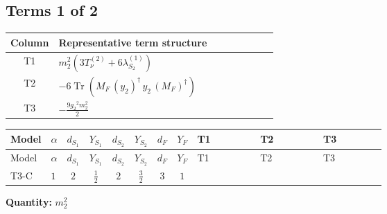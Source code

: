 \documentclass[8pt]{article}
\begin{document}
\begin{landscape}
\subsection*{Terms 1 of 2}
\begin{center}
\begin{tabular}{@{}c >{\raggedright\arraybackslash}p{0.82\linewidth}@{}}
\toprule
Column & Representative term structure \\
\midrule
T1 & \(\displaystyle {m_2^2} (3 T_{\nu}^{(2)}+6 {\lambda_{S_2}^{(1)}})\) \\
\midrule
T2 & \(\displaystyle -6 \operatorname{Tr}\!\left({M_F}\,\left({y_2}\right)^{\dagger}\,{y_2}\,\left({M_F}\right)^{\dagger}\right)\) \\
\midrule
T3 & \(\displaystyle -\frac{9 {g_2}^2 {m_2^2}}{2}\) \\
\midrule
\bottomrule
\end{tabular}
\end{center}
\smallskip
\tiny
\begin{longtable}{@{}llcccccc >{\raggedright\arraybackslash}p{0.21\linewidth} >{\raggedright\arraybackslash}p{0.21\linewidth} >{\raggedright\arraybackslash}p{0.21\linewidth}@{}}
\toprule
Model & $\alpha$ & $d_{S_1}$ & $Y_{S_1}$ & $d_{S_2}$ & $Y_{S_2}$ & $d_F$ & $Y_F$ & T1 & T2 & T3 \\
\midrule
\endfirsthead
\toprule
Model & $\alpha$ & $d_{S_1}$ & $Y_{S_1}$ & $d_{S_2}$ & $Y_{S_2}$ & $d_F$ & $Y_F$ & T1 & T2 & T3 \\
\midrule
\endhead
T3-C & $1$ & $2$ & $\frac{1}{2}$ & $2$ & $\frac{3}{2}$ & $3$ & $1$ & \scriptsize\adjustbox{max width=\linewidth}{$\begin{gathered} {m_2^2} (3 T_{\nu}^{(2)}+6 {\lambda_{S_2}^{(1)}})\end{gathered}$} & \scriptsize\adjustbox{max width=\linewidth}{$\begin{gathered} -6 \operatorname{Tr}\!\left({M_F}\,\left({y_2}\right)^{\dagger}\,{y_2}\,\left({M_F}\right)^{\dagger}\right)\end{gathered}$} & \scriptsize\adjustbox{max width=\linewidth}{$\begin{gathered} -\frac{9 {g_2}^2 {m_2^2}}{2}\end{gathered}$} \\
\midrule
\bottomrule
\end{longtable}
\clearpage
\noindent\textbf{Quantity: }$m_2^2$\par\smallskip

\end{landscape}
\end{document}
